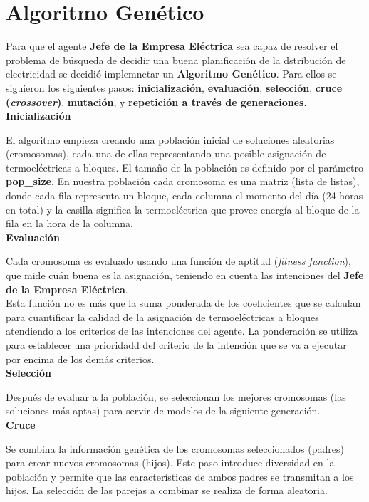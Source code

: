 \documentclass[twocolumn, fontsize=10pt]{article}
\begin{document}
\section{Algoritmo Genético}

Para que el agente \textbf{Jefe de la Empresa Eléctrica} sea capaz de resolver el problema de búsqueda de decidir una buena planificación
de la dstribución de electricidad se decidió implemnetar un \textbf{Algoritmo Genético}. Para ellos se siguieron los siguientes pasos:
\textbf{inicialización}, \textbf{evaluación}, \textbf{selección}, 
\textbf{cruce (\textit{crossover})}, \textbf{mutación}, y \textbf{repetición a través de 
generaciones}.\\

\textbf{Inicialización}

El algoritmo empieza creando una población 
inicial de soluciones aleatorias (cromosomas), cada una de 
ellas representando una posible asignación de termoeléctricas a bloques. 
El tamaño de la población es definido por el parámetro \textbf{pop\_size}. 
En nuestra población cada cromosoma es una matriz (lista de listas), donde cada fila 
representa un bloque, cada columna el momento del día (24 horas en total) y la casilla significa la termoeléctrica que provee energía al bloque de la fila en la hora de la columna. \\

\textbf{Evaluación}

Cada cromosoma es evaluado usando una función de aptitud (\textit{fitness function}), 
que mide cuán buena es la asignación, teniendo en 
cuenta las intenciones del \textbf{Jefe de la Empresa Eléctrica}. \\

Esta función no es más que la suma ponderada de los coeficientes que se calculan para cuantificar 
la calidad de la asignación de termoeléctricas a bloques atendiendo a los criterios de las intenciones del agente. La ponderación se utiliza para 
establecer una prioridadd del criterio de la intención que se va a ejecutar por encima de los demás criterios.\\

\textbf{Selección}

Después de evaluar a la población, se seleccionan los mejores 
cromosomas (las soluciones más aptas) para servir de modelos de 
la siguiente generación. \\

\textbf{Cruce}

Se combina la información genética de 
los cromosomas seleccionados (padres) para crear nuevos 
cromosomas (hijos). Este paso introduce diversidad en la 
población y permite que las características de ambos padres se 
transmitan a los hijos. La selección de las parejas a combinar 
se realiza de forma aleatoria. \\
\end{document}
